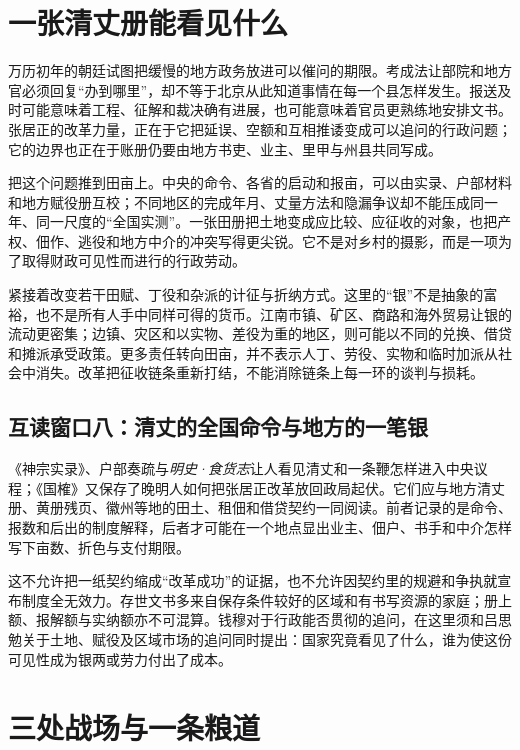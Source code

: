 \section{一张清丈册能看见什么}
\label{sec:wanli-survey}

万历初年的朝廷试图把缓慢的地方政务放进可以催问的期限。考成法让部院和地方官必须回复“办到哪里”，却不等于北京从此知道事情在每一个县怎样发生。报送及时可能意味着工程、征解和裁决确有进展，也可能意味着官员更熟练地安排文书。张居正的改革力量，正在于它把延误、空额和互相推诿变成可以追问的行政问题；它的边界也正在于账册仍要由地方书吏、业主、里甲与州县共同写成。

把这个问题推到田亩上。中央的命令、各省的启动和报亩，可以由实录、户部材料和地方赋役册互校；不同地区的完成年月、丈量方法和隐漏争议却不能压成同一年、同一尺度的“全国实测”。一张田册把土地变成应比较、应征收的对象，也把产权、佃作、逃役和地方中介的冲突写得更尖锐。它不是对乡村的摄影，而是一项为了取得财政可见性而进行的行政劳动。

紧接着改变若干田赋、丁役和杂派的计征与折纳方式。这里的“银”不是抽象的富裕，也不是所有人手中同样可得的货币。江南市镇、矿区、商路和海外贸易让银的流动更密集；边镇、灾区和以实物、差役为重的地区，则可能以不同的兑换、借贷和摊派承受政策。更多责任转向田亩，并不表示人丁、劳役、实物和临时加派从社会中消失。改革把征收链条重新打结，不能消除链条上每一环的谈判与损耗。

\subsection{互读窗口八：清丈的全国命令与地方的一笔银}

《神宗实录》、户部奏疏与\textit{明史·食货志}让人看见清丈和一条鞭怎样进入中央议程；《国榷》又保存了晚明人如何把张居正改革放回政局起伏。它们应与地方清丈册、黄册残页、徽州等地的田土、租佃和借贷契约一同阅读。前者记录的是命令、报数和后出的制度解释，后者才可能在一个地点显出业主、佃户、书手和中介怎样写下亩数、折色与支付期限。

这不允许把一纸契约缩成“改革成功”的证据，也不允许因契约里的规避和争执就宣布制度全无效力。存世文书多来自保存条件较好的区域和有书写资源的家庭；册上额、报解额与实纳额亦不可混算。钱穆对于行政能否贯彻的追问，在这里须和吕思勉关于土地、赋役及区域市场的追问同时提出：国家究竟看见了什么，谁为使这份可见性成为银两或劳力付出了成本。

\section{三处战场与一条粮道}
\label{sec:wanli-three-campaigns}

